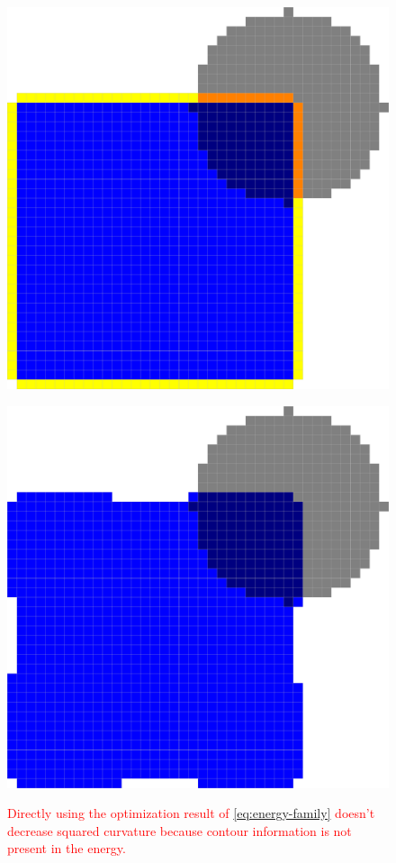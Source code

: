 \documentclass[smallextended]{svjour3}       %
\newcommand{\revision}[1]{\textcolor{red}{#1}}
\begin{document}
\begin{figure}
\begin{minipage}{0.5\textwidth}
\center
\includegraphics[scale=0.1]{images/flow/contour-information/before-opt.pdf}
\label{fig:contour-info-1}
\end{minipage}%
\begin{minipage}{0.5\textwidth}
\center
\includegraphics[scale=0.1]{images/flow/contour-information/after-opt.pdf}
\label{fig:contour-info-2}
\end{minipage}%
\caption{ \revision{Directly using the optimization result of \eqref{eq:energy-family} doesn't decrease squared curvature because contour information is not present in the energy.}}
\label{fig:contour-info}
\end{figure}
\end{document}
